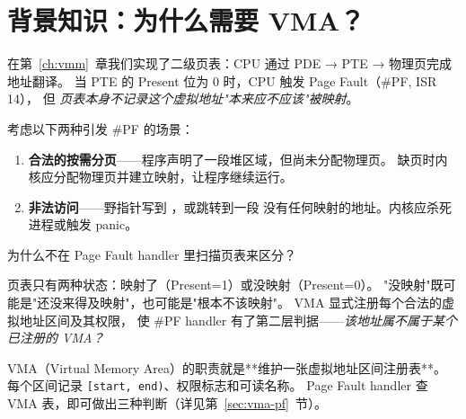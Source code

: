 \section{背景知识：为什么需要 VMA？}

在第~\ref{ch:vmm}~章我们实现了二级页表：CPU 通过 PDE → PTE → 物理页完成地址翻译。
当 PTE 的 Present 位为 0 时，CPU 触发 Page Fault（\#PF, ISR 14），
但 \emph{页表本身不记录这个虚拟地址"本来应不应该"被映射}。

考虑以下两种引发 \#PF 的场景：

\begin{enumerate}
  \item \textbf{合法的按需分页}——程序声明了一段堆区域，但尚未分配物理页。
        缺页时内核应分配物理页并建立映射，让程序继续运行。
  \item \textbf{非法访问}——野指针写到 ，或跳转到一段
        没有任何映射的地址。内核应杀死进程或触发 panic。
\end{enumerate}

\begin{whybox}
为什么不在 Page Fault handler 里扫描页表来区分？

页表只有两种状态：映射了（Present=1）或没映射（Present=0）。
"没映射"既可能是"还没来得及映射"，也可能是"根本不该映射"。
VMA 显式注册每个合法的虚拟地址区间及其权限，
使 \#PF handler 有了第二层判据——\emph{该地址属不属于某个已注册的 VMA？}
\end{whybox}

VMA（Virtual Memory Area）的职责就是**维护一张虚拟地址区间注册表**。
每个区间记录 \texttt{[start, end)}、权限标志和可读名称。
Page Fault handler 查 VMA 表，即可做出三种判断（详见第~\ref{sec:vma-pf}~节）。


